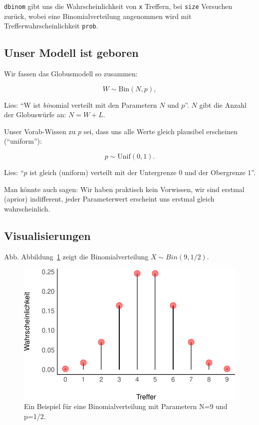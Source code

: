 \documentclass[
  a4paper,
  DIV=11]{scrreprt}
\theoremstyle{definition}
\theoremstyle{remark}
\begin{document}
\texttt{dbinom} gibt uns die Wahrscheinlichkeit von \texttt{x} Treffern,
bei \texttt{size} Versuchen zurück, wobei eine Binomialverteilung
angenommen wird mit Trefferwahrscheinlichkeit \texttt{prob}.

\hypertarget{unser-modell-ist-geboren}{%
\subsection{Unser Modell ist geboren}\label{unser-modell-ist-geboren}}

Wir fassen das Globusmodell so zusammen:

\[W \sim \text{Bin}(N,p),\]

Lies: ``W ist \emph{bin}omial verteilt mit den Parametern \(N\) und
\(p\)''. \(N\) gibt die Anzahl der Globuswürfe an: \(N=W+L\).

Unser Vorab-Wissen zu \(p\) sei, dass uns alle Werte gleich plausibel
erscheinen (``uniform''):

\[p \sim \text{Unif}(0,1).\]

Lies: ``\(p\) ist gleich (uniform) verteilt mit der Untergrenze 0 und
der Obergrenze 1''.

Man könnte auch sagen: Wir haben praktisch kein Vorwissen, wir sind
erstmal (aprior) indifferent, jeder Parameterwert erscheint uns erstmal
gleich wahrscheinlich.

\hypertarget{visualisierungen}{%
\subsection{Visualisierungen}\label{visualisierungen}}

Abb. Abbildung~\ref{fig-bin-klein} zeigt die Binomialverteilung
\(X \sim Bin(9, 1/2)\).

\begin{figure}

{\centering \includegraphics{./Globusversuch_files/figure-pdf/fig-bin-klein-1.pdf}

}

\caption{\label{fig-bin-klein}Ein Beispiel für eine Binomialverteilung
mit Parametern N=9 und p=1/2.}

\end{figure}
\end{document}
